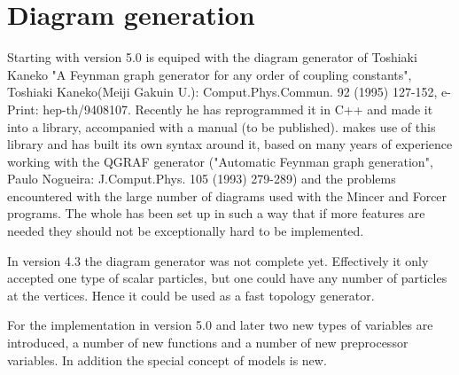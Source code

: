  
\chapter{Diagram generation}
\label{diagrams}

Starting with version 5.0 \FORM is equiped with the diagram generator of 
Toshiaki Kaneko "A Feynman graph generator for any order of coupling 
constants", Toshiaki Kaneko(Meiji Gakuin U.): Comput.Phys.Commun. 92 (1995) 
127-152, e-Print: hep-th/9408107. Recently he has reprogrammed it in C++ 
and made it into a library, accompanied with a manual (to be published). 
\FORM makes use of this library and has built its own syntax around it, 
based on many years of experience working with the QGRAF generator 
("Automatic Feynman graph generation", Paulo Nogueira: J.Comput.Phys. 105 
(1993) 279-289) and the problems encountered with the large number of 
diagrams used with the Mincer and Forcer programs. The whole has been set 
up in such a way that if more features are needed they should not be 
exceptionally hard to be implemented.

In version 4.3 the diagram generator was not complete yet. Effectively it 
only accepted one type of scalar particles, but one could have any number 
of particles at the vertices. Hence it could be used as a fast topology 
generator.

For the \FORM implementation in version 5.0 and later two new types of 
variables are introduced, a number of new functions and a number of new 
preprocessor variables. In addition the special concept of models is new.

